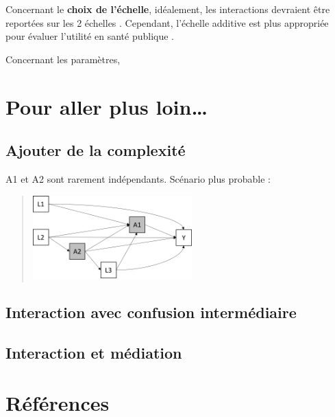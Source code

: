 \documentclass[
]{book}
\begin{document}
Concernant le \textbf{choix de l'échelle}, idéalement, les interactions devraient être reportées sur les 2 échelles \citet{knol_recommendations_2012} \citet{vanderweele_tutorial_2014}. Cependant, l'échelle additive est plus appropriée pour évaluer l'utilité en santé publique \citet{vanderweele_tutorial_2014} \citet{knol_recommendations_2012}.

Concernant les paramètres,

\hypertarget{pour-aller-plus-loin}{%
\chapter{Pour aller plus loin\ldots{}}\label{pour-aller-plus-loin}}

\hypertarget{ajouter-de-la-complexituxe9}{%
\section{Ajouter de la complexité}\label{ajouter-de-la-complexituxe9}}

A1 et A2 sont rarement indépendants. Scénario plus probable :

\begin{quote}
\includegraphics[width=0.5\textwidth,height=\textheight]{img/Image11.png}
\end{quote}

\hypertarget{interaction-avec-confusion-intermuxe9diaire}{%
\section{Interaction avec confusion intermédiaire}\label{interaction-avec-confusion-intermuxe9diaire}}

\hypertarget{interaction-et-muxe9diation}{%
\section{Interaction et médiation}\label{interaction-et-muxe9diation}}

\citet{vanderweele_three-way_2013}

\citet{vanderweele_unification_2014}

\hypertarget{ruxe9fuxe9rences}{%
\chapter{Références}\label{ruxe9fuxe9rences}}

  
\end{document}
